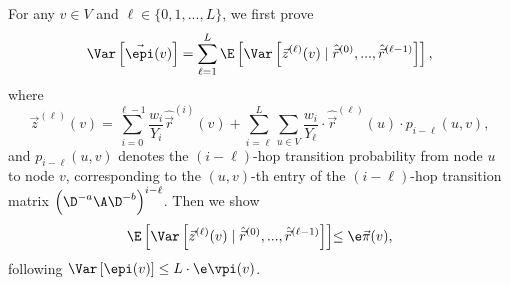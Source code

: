 For any $v \in V$ and $\ell \in \{0,1, ... , L\}$, we first prove 
\begin{equation}\label{eqn:eq1}
\Var \left[ \vec{\epi}(v) \right]= \sum_{\ell=1}^{L} \E \left[ \Var \left[\vec{z}^{(\ell)}(v)\mid \hat{\vec{r}}^{(0)},...,\hat{\vec{r}}^{(\ell-1)}\right]\right],
\end{equation}
where 
\begin{equation}\label{eqn:def-z}
\vec{z}^{(\ell)}(v)=\sum_{i=0}^{\ell-1} \frac{w_i}{Y_i}\hat{\vec{r}}^{(i)}(v)+ \sum_{i=\ell}^{L}\sum_{u \in V} \frac{w_i}{Y_{\ell}} \cdot \hat{\vec{r}}^{(\ell)}(u)\cdot p_{i-\ell}(u,v),     
\end{equation}
and $p_{i-\ell}(u,v)$ denotes the $(i-\ell)$-hop transition probability from node $u$ to node $v$,  corresponding to the $(u,v)$-th entry of the $(i-\ell)$-hop transition matrix $\left(\D^{-a} \A \D^{-b}\right)^{i-\ell}$. %
Then we show 
\begin{equation}\label{eqn:eq2}
\E \left[ \Var \left[\vec{z}^{(\ell)}(v)\mid \hat{\vec{r}}^{(0)},...,\hat{\vec{r}}^{(\ell-1)}\right]\right] \hspace{-1mm} \le \e \vec{\pi}(v),     
\end{equation}
following $\Var\left[\epi(v)\right]\le L \cdot \e \vpi(v)$.  

